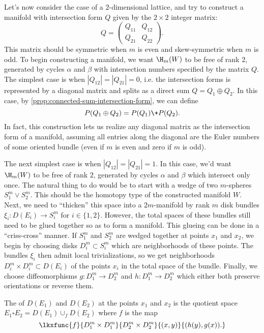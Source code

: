 Let's now consider the case of a $2$-dimensional lattice, and try to construct a manifold with intersection form $Q$ given by the $2\times 2$ integer matrix:
\[
	Q = \begin{pmatrix} Q_{11} & Q_{12} \\ Q_{21} & Q_{22}\end{pmatrix}.
\]
This matrix should be symmetric when $m$ is even and skew-symmetric when $m$ is odd. To begin constructing a manifold, we want $\H_m(W)$ to be free of rank $2$, generated by cycles $\alpha$ and $\beta$ with intersection numbers specified by the matrix $Q$. The simplest case is when $|Q_{12}|=|Q_{21}|=0$, i.e. the intersection forms is represented by a diagonal matrix and splits as a direct sum $Q=Q_1\oplus Q_2$. In this case, by \cref{prop:connected-sum-intersection-form}, we can define
\[
	P(Q_1\oplus Q_2) = P(Q_1)\+ P(Q_2).
\]
In fact, this construction lets us realize any diagonal matrix as the intersection form of a manifold, assuming all entries along the diagonal are the Euler numbers of some oriented bundle (even if $m$ is even and zero if $m$ is odd).

The next simplest case is when $|Q_{12}|=|Q_{21}|=1$. In this case, we'd want $\H_m(W)$ to be free of rank $2$, generated by cycles $\alpha$ and $\beta$ which intersect only once. The natural thing to do would be to start with a wedge of two $m$-spheres $S^m_1\vee S^m_2$. This should be the homotopy type of the constructed manifold $W$. Next, we need to ``thicken'' this space into a $2m$-manifold by rank $m$ disk bundles $\xi_i : D(E_i) \to S^m_i$ for $i\in\{1,2\}$. However, the total spaces of these bundles still need to be glued together so as to form a manifold. This glueing can be done in a ``criss-cross'' manner. If $S^m_1$ and $S^m_2$ are wedged together at points $x_1$ and $x_2$, we begin by choosing disks $D_i^m\subset S^m_i$ which are neighborhoods of these points. The bundles $\xi_i$ then admit local trivializations, so we get neighborhoods $D_i^m\times D^m_i \subset D(E_i)$ of the points $x_i$ in the total space of the bundle. Finally, we choose diffeomorphisms $g : D_1^m \to D_2^m$ and $h : D_1^m \to D_2^m$ which either both preserve orientations or reverse them.

\begin{definition}\label{def:plumbing}
	The  of $D(E_1)$ and $D(E_2)$ at the points $x_1$ and $x_2$ is the quotient space $E_1\square E_2 =D(E_1)\cup_f D(E_2)$ where $f$ is the map
	\[
		\lkxfunc{f}{D_1^m\times D_1^m}{D_2^m\times D_2^m}{(x,y)}{(h(y), g(x)).}
	\]
\end{definition}

